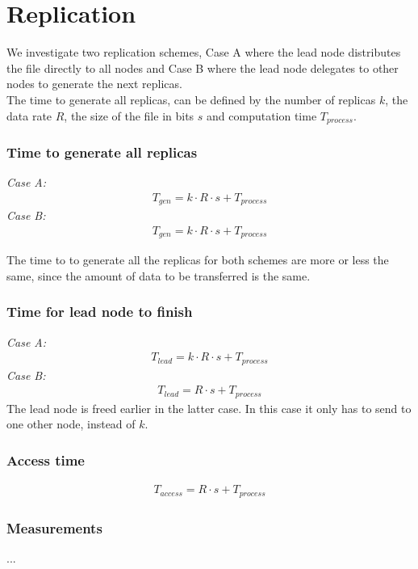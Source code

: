 \section{Replication}
We investigate two replication schemes, Case A where the lead node distributes the file directly to all nodes and Case B where the lead node delegates to other nodes to generate the next replicas. \\
The time to generate all replicas, can be defined by the number of replicas $k$, the data rate $R$, the size of the file in bits $s$ and computation time $T_{process}$. 
\subsubsection*{Time to generate all replicas}
\textit{Case A:} 
\begin{align}
    T_{gen} = k\cdot R\cdot s + T_{process}
\end{align}
\textit{Case B:} 
\begin{align}
    T_{gen} = k\cdot R\cdot s + T_{process}
\end{align}

The time to to generate all the replicas for both schemes are more or less the same, since the amount of data to be transferred is the same. 

\subsubsection*{Time for lead node to finish}
\textit{Case A:}
\begin{align}
    T_{lead} = k\cdot R\cdot s + T_{process}
\end{align}
\textit{Case B:}
\begin{align}
    T_{lead} = R \cdot s + T_{process}
\end{align}
The lead node is freed earlier in the latter case. In this case it only has to send to one other node, instead of $k$.

\subsubsection*{Access time}
\begin{align}
    T_{access} = R \cdot s + T_{process}
\end{align}

\subsubsection*{Measurements}
...